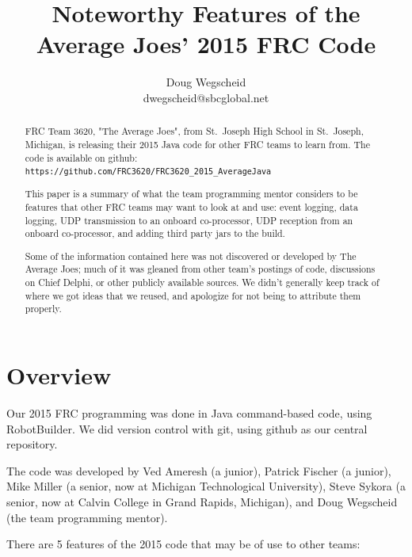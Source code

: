 \documentclass[]{article}
\title{Noteworthy Features of the Average Joes' 2015 FRC Code}
\author{Doug Wegscheid \\ dwegscheid@sbcglobal.net}
\begin{document}
\maketitle

\begin{abstract}

FRC Team 3620, "The Average Joes", from St.\ Joseph High School in St.\ Joseph, Michigan, is releasing their 2015 Java code for other FRC teams to learn from.
The code is available on github:
\\
\texttt{https://github.com/FRC3620/FRC3620\_2015\_AverageJava}

This paper is a summary of what the team programming mentor considers to be features that other FRC teams may want to look at and use: event logging, data logging, UDP transmission to an onboard co-processor, UDP reception from an onboard co-processor, and adding third party jars to the build.

Some of the information contained here was not discovered or developed by The Average Joes; much of it was gleaned from other team's postings of code, discussions on Chief Delphi, or other publicly available sources.
We didn't generally keep track of where we got ideas that we reused, and apologize for not being to  attribute them properly.

\end{abstract}

\section{Overview}

Our 2015 FRC programming was done in Java command-based code, using RobotBuilder.
We did version control with git, using github as our central repository.

The code was developed by Ved Ameresh (a junior), Patrick Fischer (a junior), Mike Miller (a senior, now at Michigan Technological University), Steve Sykora (a senior, now at Calvin College in Grand Rapids, Michigan), and Doug Wegscheid (the team programming mentor).

There are 5 features of the 2015 code that may be of use to other teams:
\end{document}
